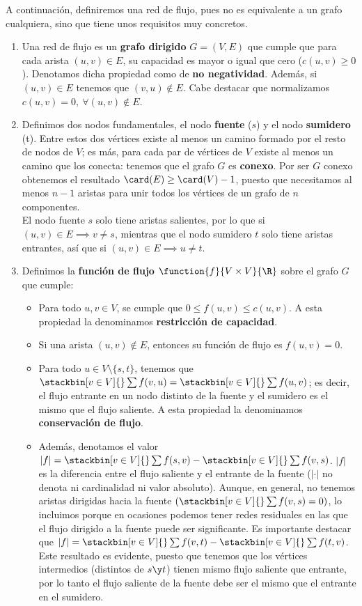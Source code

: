 \begin{defi} A continuación, definiremos una red de flujo, pues no es equivalente a un grafo cualquiera, sino que tiene unos requisitos muy concretos.
\begin{enumerate}[1)]
\item Una red de flujo es un \textbf{grafo dirigido} $G = (V,E)$ que cumple que para cada arista $(u,v)\in E$, su capacidad es mayor o igual que cero ($c(u,v) \geq 0$). Denotamos dicha propiedad como de \textbf{no negatividad}. Además, si $(u,v)\in E$ tenemos que $(v,u)\notin E$. Cabe destacar que normalizamos $c(u,v) = 0,\ \forall (u,v)\notin E$.
\item Definimos dos nodos fundamentales, el nodo \textbf{fuente} ($s$) y el nodo \textbf{sumidero} (t). Entre estos dos vértices existe al menos un camino formado por el resto de nodos de $V$; es más, para cada par de vértices de $V$ existe al menos un camino que los conecta: tenemos que el grafo $G$ es \textbf{conexo}. Por ser $G$ conexo obtenemos el resultado $\card(E)\geq \card(V)-1$, puesto que necesitamos al menos $n - 1$ aristas para unir todos los vértices de un grafo de $n$ componentes.\\  
El nodo fuente $s$ solo tiene aristas salientes, por lo que si $(u,v)\in E \implies v\neq s$, mientras que el nodo sumidero $t$ solo tiene aristas entrantes, así que si $(u,v)\in E \implies u\neq t$.
\item Definimos la \textbf{función de flujo} $\function{f}{V\times V}{\R}$ sobre el grafo $G$ que cumple:
\begin{itemize}
\item Para todo $u, v\in V$, se cumple que $0\leq f(u,v)\leq c(u,v)$. A esta propiedad la denominamos \textbf{restricción de capacidad}.
\item Si una arista $(u,v)\notin E$, entonces su función de flujo es $f(u,v)=0$.
\item Para todo $u\in V\setminus\{s,t\}$, tenemos que $\stackbin[v\in V]{}\sum f(v,u) = \stackbin[v\in V]{}\sum f(u,v)$; es decir, el flujo entrante en un nodo distinto de la fuente y el sumidero es el mismo que el flujo saliente. A esta propiedad la denominamos \textbf{conservación de flujo}.
\item Además, denotamos el valor $|f|= \stackbin[v\in V]{}\sum f(s,v)- \stackbin[v\in V]{}\sum f(v,s)$. $|f|$ es la diferencia entre el flujo saliente y el entrante de la fuente ($|\cdot|$ no denota ni cardinalidad ni valor absoluto). Aunque, en general, no tenemos aristas dirigidas hacia la fuente $\left(\stackbin[v\in V]{}\sum f(v,s)= 0\right)$, lo incluimos porque en ocasiones podemos tener redes residuales en las que el flujo dirigido a la fuente puede ser significante. Es importante destacar que $|f|= \stackbin[v\in V]{}\sum f(v,t)- \stackbin[v\in V]{}\sum f(t,v)$. Este resultado es evidente, puesto que tenemos que los vértices intermedios (distintos de $s\y t$) tienen mismo flujo saliente que entrante, por lo tanto el flujo saliente de la fuente debe ser el mismo que el entrante en el sumidero.
\end{itemize}
\end{enumerate}
\end{defi}

